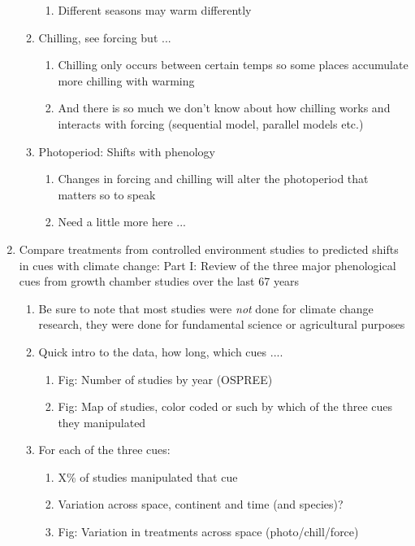 \documentclass[11pt,letterpaper]{article}
\begin{document}
\begin{enumerate}
\begin{enumerate}
\begin{enumerate}
\item Different seasons may warm differently
\end{enumerate}
\item Chilling, see forcing but ... 
\begin{enumerate}
\item Chilling only occurs between certain temps so some places accumulate more chilling with warming
\item And there is so much we don't know about how chilling works and interacts with forcing (sequential model, parallel models etc.)
\end{enumerate}
\item Photoperiod: Shifts with phenology
\begin{enumerate}
\item Changes in forcing and chilling will alter the photoperiod that matters so to speak
\item Need a little more here ... 
\end{enumerate}
\end{enumerate}
\item Compare treatments from controlled environment studies to predicted shifts in cues with climate change: Part I: Review of the three major phenological cues from growth chamber studies over the last 67 years %
\begin{enumerate}
\item Be sure to note that most studies were \emph{not} done for climate change research, they were done for fundamental science or agricultural purposes 
\item Quick intro to the data, how long, which cues .... 
\begin{enumerate}
\item Fig: Number of studies by year (OSPREE)
\item Fig: Map of studies, color coded or such by which of the three cues they manipulated
\end{enumerate}
\item For each of the three cues:
\begin{enumerate}
\item  X\% of studies manipulated that cue
\item Variation across space, continent and time (and species)? 
\item Fig: Variation in treatments across space (photo/chill/force)

\end{enumerate}
\end{enumerate}
\end{enumerate}
\end{document}
